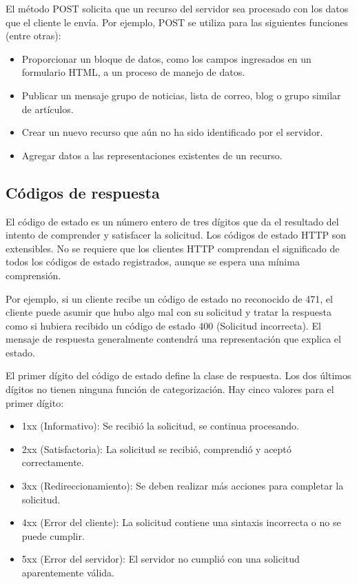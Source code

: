 El método POST solicita que un recurso del servidor sea procesado con 
los datos que el cliente le envía. Por ejemplo, POST se utiliza para 
las siguientes funciones (entre otras):

\begin{itemize}
   \setlength\itemsep{-0.6em}
   \item Proporcionar un bloque de datos, como los campos ingresados 
   en un formulario HTML, a un proceso de manejo de datos.
   \item Publicar un mensaje grupo de 
   noticias, lista de correo, blog o grupo similar de artículos.
   \item Crear un nuevo recurso que aún no ha sido identificado por 
   el servidor.
   \item Agregar datos a las representaciones existentes de un recurso.
\end{itemize}


\subsection{Códigos de respuesta} 
El código de estado es un número entero de tres dígitos que da el 
resultado del intento de comprender y satisfacer la solicitud.
   Los códigos de estado HTTP son extensibles. No se requiere que los
    clientes HTTP comprendan el significado de todos los códigos de
     estado registrados, aunque se espera una mínima comprensión.

   Por ejemplo, si un cliente recibe un código de estado no reconocido
    de 471, el cliente puede asumir que hubo algo mal con su solicitud
     y tratar la respuesta como si hubiera recibido un código de estado
      400 (Solicitud incorrecta). El mensaje de respuesta generalmente 
      contendrá una representación que explica el estado.

   El primer dígito del código de estado define la clase de respuesta.
    Los dos últimos dígitos no tienen ninguna función de categorización.
     Hay cinco valores para el primer dígito:

   \begin{itemize}
      \setlength\itemsep{-0.6em}
      \item 1xx (Informativo): Se recibió la solicitud, se continua procesando.
      \item 2xx (Satisfactoria): La solicitud se recibió, comprendió y 
      aceptó correctamente.
      \item 3xx (Redireccionamiento): Se deben realizar más acciones para
    completar la solicitud.
    \item 4xx (Error del cliente): La solicitud contiene una sintaxis
    incorrecta o no se puede cumplir.
    \item 5xx (Error del servidor): El servidor no cumplió con una
       solicitud aparentemente válida.
   \end{itemize}

